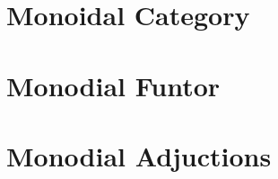 \documentclass[11pt]{article}
\begin{document}
\tableofcontents

\section{Monoidal Category}
\label{sec:monoidal_category}




\section{Monodial Funtor}
\label{sec:monoidal_funtor}

\section{Monodial Adjuctions}
\label{sec:monodial_adjuctions}
\end{document}

